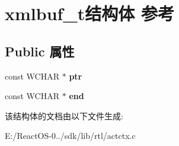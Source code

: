 \hypertarget{structxmlbuf__t}{}\section{xmlbuf\+\_\+t结构体 参考}
\label{structxmlbuf__t}
\subsection*{Public 属性}
\begin{DoxyCompactItemize}
\item 
\mbox{\label{structxmlbuf__t_aec9c34b43ec299ddcfdce42d735c78bd}} 
const W\+C\+H\+AR $\ast$ {\bfseries ptr}
\item 
\mbox{\label{structxmlbuf__t_aba1f44b85cbbab76a9882e34684a858a}} 
const W\+C\+H\+AR $\ast$ {\bfseries end}
\end{DoxyCompactItemize}


该结构体的文档由以下文件生成\+:\begin{DoxyCompactItemize}
\item 
E\+:/\+React\+O\+S-\/0../sdk/lib/rtl/actctx.\+c\end{DoxyCompactItemize}
